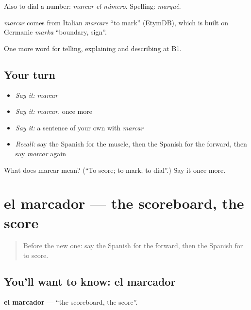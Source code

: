 Also to dial a number: \emph{marcar el número}. Spelling: \emph{marqué}.

\begin{cousinweb}
\emph{marcar} comes from Italian \emph{marcare} \textquotedblleft{}to mark\textquotedblright{} (EtymDB), which is built on Germanic \emph{marka} \textquotedblleft{}boundary, sign\textquotedblright{}.
\end{cousinweb}

\begin{grammarlens}[title={What you've built}]
One more word for telling, explaining and describing at B1.
\end{grammarlens}

\subsection*{Your turn}
\begin{itemize}
\raggedright
  \item \emph{Say it:} \emph{marcar}
  \item \emph{Say it:} \emph{marcar}, once more
  \item \emph{Say it:} a sentence of your own with \emph{marcar}
  \item \emph{Recall:} say the Spanish for the muscle, then the Spanish for the forward, then say \emph{marcar} again
\end{itemize}

\begin{tcolorbox}[breakable,colback=teal!4,colframe=teal!35!black,title={Before you move on}]
What does marcar mean? (\textquotedblleft{}To score; to mark; to dial\textquotedblright{}.) Say it once more.
\end{tcolorbox}
\section[el marcador]{el marcador — the scoreboard, the score}

\label{lesson:ES-C756-marcador}



\begin{quote}
Before the new one: say the Spanish for the forward, then the Spanish for to score.
\end{quote}

\subsection*{You'll want to know: el marcador}
\textbf{el marcador} — \textquotedblleft{}the scoreboard, the score\textquotedblright{}.

